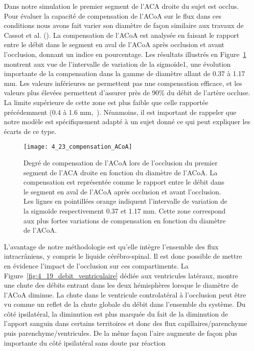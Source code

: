 Dans notre simulation le premier segment de l’ACA droite du sujet est occlus. Pour évaluer la
capacité de compensation de l’ACoA sur le flux dans ces conditions nous avons fait varier son diamètre
de façon similaire aux travaux de Cassot et al. (\cite{Cassot1995}). La compensation de l’ACoA est analysée en faisant
le rapport entre le débit dans le segment en aval de l’ACoA après occlusion et avant l’occlusion,
donnant un indice en pourcentage. Les résultats illustrés en Figure~\ref{fig:4_23_compensation_ACoA} montrent aux vue de l’intervalle
de variation de la sigmoïde1, une évolution importante de la compensation dans la gamme de diamètre
allant de 0.37 à 1.17 mm. Les valeurs inférieures ne permettent pas une compensation efficace, et les
valeurs plus élevées permettent d’assurer près de 90\% du débit de l’artère occluse. La limite supérieure
de cette zone est plus faible que celle rapportée précédemment (0.4 à 1.6 mm,~\cite{Cassot1995}). Néanmoins, il est
important de rappeler que notre modèle est spécifiquement adapté à un sujet donné ce qui peut
expliquer les écarts de ce type.\\
\begin{figure}[!t]
\centering
\texttt{[image: 4\_23\_compensation\_ACoA]}
\caption{ Degré de compensation de l'ACoA lors de l'occlusion du premier segment de l'ACA droite en fonction du diamètre
de l'ACoA. La compensation est représentée comme le rapport entre le débit dans le segment en aval de l’ACoA après
occlusion et avant l’occlusion. Les lignes en pointillées orange indiquent l’intervalle de variation de la sigmoïde
respectivement 0.37 et 1.17 mm. Cette zone correspond aux plus fortes variations de compensation en fonction du diamètre
de l’ACoA.}
\label{fig:4_23_compensation_ACoA}	
\end{figure}
L’avantage de notre méthodologie est qu’elle intègre l’ensemble des flux intracrâniens, y
compris le liquide cérébro-spinal. Il est donc possible de mettre en évidence l’impact de l’occlusion sur
ces compartiments. La Figure~\ref{fig:4_19_debit_ventriculaire} dédiée aux ventricules latéraux, montre une chute des débits entrant
dans les deux hémisphères lorsque le diamètre de l’ACoA diminue. La chute dans le ventricule
controlatéral à l’occlusion peut être vu comme un reflet de la chute globale du débit dans l’ensemble
du système. Du côté ipsilatéral, la diminution est plus marquée du fait de la diminution de l’apport
sanguin dans certains territoires et donc des flux capillaires/parenchyme puis parenchyme/ventricules.
De la même façon l’aire augmente de façon plus importante du côté ipsilatéral sans doute par réaction
